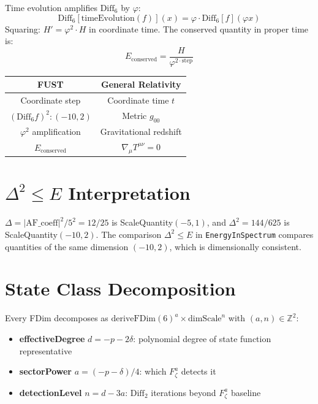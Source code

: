 Time evolution amplifies $\mathrm{Diff}_6$ by $\varphi$:
\[
\mathrm{Diff}_6[\mathrm{timeEvolution}(f)](x) = \varphi \cdot \mathrm{Diff}_6[f](\varphi x)
\]
Squaring: $H' = \varphi^2 \cdot H$ in coordinate time. The conserved quantity in proper time is:
\[
E_{\mathrm{conserved}} = \frac{H}{\varphi^{2 \cdot \mathrm{step}}}
\]

\begin{center}
\begin{tabular}{|c|c|}
\hline
FUST & General Relativity \\
\hline
Coordinate step & Coordinate time $t$ \\
$(\mathrm{Diff}_6 f)^2 : (-10, 2)$ & Metric $g_{00}$ \\
$\varphi^2$ amplification & Gravitational redshift \\
$E_{\mathrm{conserved}}$ & $\nabla_\mu T^{\mu\nu} = 0$ \\
\hline
\end{tabular}
\end{center}

\section{\texorpdfstring{$\Delta^2 \leq E$}{Δ^2 ≤ E} Interpretation}
\label{sec:dim_spectral_gap}

\begin{theorem}
\label{thm:dim_spectral_gap}
\leanok
$\Delta = |\mathrm{AF\_coeff}|^2/5^2 = 12/25$ is ScaleQuantity$(-5, 1)$, and $\Delta^2 = 144/625$ is ScaleQuantity$(-10, 2)$.
The comparison $\Delta^2 \leq E$ in \texttt{EnergyInSpectrum} compares quantities of the same dimension $(-10, 2)$,
which is dimensionally consistent.
\end{theorem}

\section{State Class Decomposition}
\label{sec:dim_state_class}

Every FDim decomposes as $\mathrm{deriveFDim}(6)^a \times \mathrm{dimScale}^n$ with $(a,n) \in \mathbb{Z}^2$:
\begin{itemize}
\item \textbf{effectiveDegree} $d = -p - 2\delta$: polynomial degree of state function representative
\item \textbf{sectorPower} $a = (-p - \delta) / 4$: which $F_\zeta^a$ detects it
\item \textbf{detectionLevel} $n = d - 3a$: $\mathrm{Diff}_2$ iterations beyond $F_\zeta^a$ baseline
\end{itemize}

